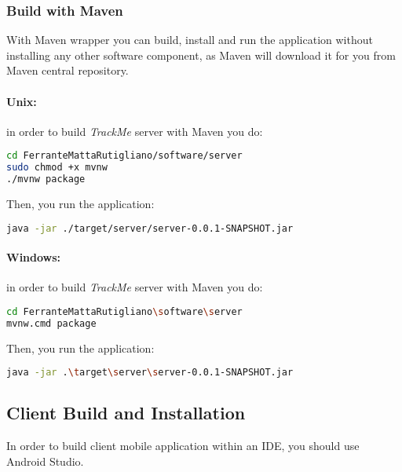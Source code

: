 \documentclass[a4paper]{article}
\begin{document}
\subsubsection{Build with Maven}
With Maven wrapper you can build, install and run the application without installing any other software component, as Maven will download it for you from Maven central repository.

\paragraph{Unix:} in order to build \textit{TrackMe} server with Maven you do:

\begin{lstlisting}[language=bash]
cd FerranteMattaRutigliano/software/server
sudo chmod +x mvnw
./mvnw package
\end{lstlisting}

Then, you run the application:

\begin{lstlisting}[language=bash]
java -jar ./target/server/server-0.0.1-SNAPSHOT.jar
\end{lstlisting}

\paragraph{Windows:} in order to build \textit{TrackMe} server with Maven you do:

\begin{lstlisting}[language=bash]
cd FerranteMattaRutigliano\software\server
mvnw.cmd package
\end{lstlisting}

Then, you run the application:

\begin{lstlisting}[language=bash]
java -jar .\target\server\server-0.0.1-SNAPSHOT.jar
\end{lstlisting}

\subsection{Client Build and Installation}
In order to build client mobile application within an IDE, you should use Android Studio.
\end{document}
